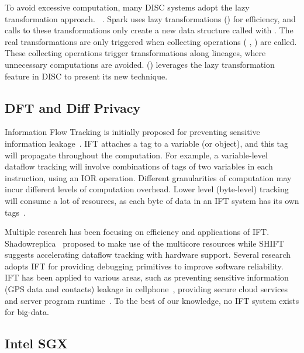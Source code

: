 To avoid excessive computation, many DISC systems adopt the lazy transformation 
approach.
~\cite{pig:vldb08,nsdi12:spark,osdi08:dryad}.
Spark uses lazy transformations (\eg {}) for efficiency,
and calls to these transformations only create a new data structure called 
 with .
The real transformations are only triggered when collecting operations (\eg 
{},
) are called. These collecting operations trigger transformations 
along
lineages, where unnecessary computations are avoided. 
\kakute () leverages the lazy transformation
feature in DISC to present its new \lazyp technique.

\vspace{-.15in}\subsection{DFT and Diff Privacy}
\label{sec:dft}\vspace{-.075in}

Information Flow Tracking is initially proposed for preventing sensitive 
information
leakage~\cite{dawn05:taint}.
IFT attaches a tag to a variable (or object),
and this tag will propagate throughout the computation.
For example, a variable-level dataflow tracking will involve combinations of
tags of two variables in each instruction, using an IOR operation.
Different granularities of computation may incur different levels
of computation overhead. Lower level (\eg byte-level) tracking will consume
a lot of resources, as each byte of data in an IFT system has its own 
tags~\cite{libdft:vee12}.
 
Multiple research has been focusing on efficiency and applications of IFT.
Shadowreplica~\cite{shadowreplica:ccs13} proposed to make use of the multicore 
resources while SHIFT~\cite{hardwardtaint:isca08}
suggests accelerating dataflow tracking with hardware support.
Several research~\cite{mit07:coverage,fse12:dtam} adopts IFT for providing 
debugging primitives
to improve software reliability.
IFT has been applied to various areas, such as preventing sensitive information 
(\eg GPS data and contacts)
leakage in cellphone~\cite{taintdroid:osdi10, cleanos:osdi12}, providing secure
cloud services~\cite{cloudfence:raid13} and server program 
runtime~\cite{libdft:vee12}.
To the best of
our knowledge, no IFT system exists for big-data.

\vspace{-.15in}\subsection{Intel SGX}
\label{sec:sgx}\vspace{-.075in}

